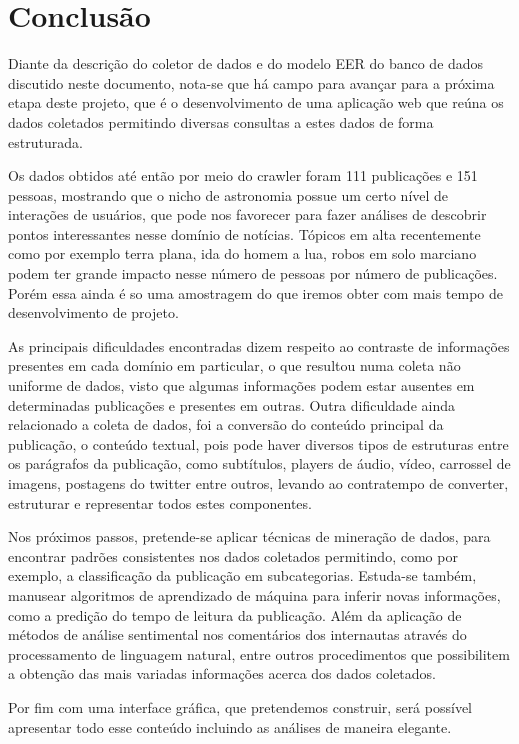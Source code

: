 
\section{Conclusão}

Diante da descrição do coletor de dados e do modelo EER do banco de dados discutido neste documento, nota-se que há campo para avançar para a próxima etapa deste projeto, que é o desenvolvimento de uma aplicação web que reúna os dados coletados permitindo diversas consultas a estes dados de forma estruturada.

Os dados obtidos até então por meio do crawler foram 111 publicações e 151 pessoas, mostrando que o nicho de astronomia possue um certo nível de interações de usuários, que pode nos favorecer para fazer análises de descobrir pontos interessantes nesse domínio de notícias. Tópicos em alta recentemente como por exemplo terra plana, ida do homem a lua, robos em solo marciano podem ter grande impacto nesse número de pessoas por número de publicações. Porém essa ainda é so uma amostragem do que iremos obter com mais tempo de desenvolvimento de projeto.

As principais dificuldades encontradas dizem respeito ao contraste de informações presentes em cada domínio em particular, o que resultou numa coleta não uniforme de dados, visto que algumas informações podem estar ausentes em determinadas publicações e presentes em outras. Outra dificuldade ainda relacionado a coleta de dados, foi a conversão do conteúdo principal da publicação, o conteúdo textual, pois pode haver diversos tipos de estruturas entre os parágrafos da publicação, como subtítulos, players de áudio, vídeo, carrossel de imagens, postagens do twitter entre outros, levando ao contratempo de converter, estruturar e representar todos estes componentes.


Nos próximos passos, pretende-se aplicar técnicas de mineração de dados, para encontrar padrões consistentes nos dados coletados permitindo, como por exemplo, a classificação da publicação em subcategorias. Estuda-se também, manusear algoritmos de aprendizado de máquina para inferir novas informações, como a predição do tempo de leitura da publicação. Além da aplicação de métodos de análise sentimental nos comentários dos internautas através do processamento de linguagem natural, entre outros procedimentos que possibilitem a obtenção das mais variadas informações acerca dos dados coletados.

Por fim com uma interface gráfica, que pretendemos construir, será possível apresentar todo esse conteúdo incluindo as análises de maneira elegante.
